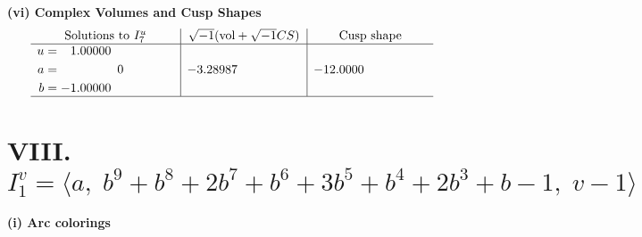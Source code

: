 \documentclass[1p]{elsarticle_modified}
\theoremstyle{definition}
\newcommand{\I}{\sqrt{-1}}
\begin{document}
\newpage\flushleft \textbf{(vi) Complex Volumes and Cusp Shapes}
$$\begin{array}{c|c|c}  
\text{Solutions to }I^u_{7}& \I (\text{vol} + \sqrt{-1}CS) & \text{Cusp shape}\\
 \hline 
\begin{aligned}
u &= \phantom{-}1.00000\phantom{ +0.000000I} \\
a &= \phantom{-0.000000 } 0 \\
b &= -1.00000\phantom{ +0.000000I}\end{aligned}
 & -3.28987\phantom{ +0.000000I} & -12.0000\phantom{ +0.000000I}\\
 \hline 
 \end{array}$$\newpage\newpage\renewcommand{\arraystretch}{1}
\centering \section*{VIII. $I^v_{1}= \langle a,\;b^9+b^8+2 b^7+b^6+3 b^5+b^4+2 b^3+b-1,\;v-1 \rangle$}
\flushleft \textbf{(i) Arc colorings}\\
\end{document}
